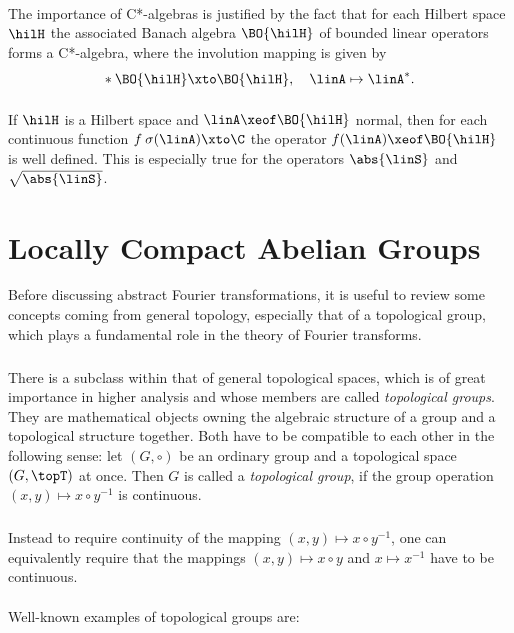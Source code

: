\documentclass[11pt,twoside]{article}
\begin{document}
\paragraph{} %
The importance of C*-algebras is justified by the fact 
that for each Hilbert space $\hilH$
the associated Banach algebra $\BO{\hilH}$ of bounded linear operators 
forms a C*-algebra, where the involution mapping is given by
\[
* \: \BO{\hilH} \xto \BO{\hilH}, \quad \linA \mapsto \linA^*.
\]

\paragraph{}
If $\hilH$ is a Hilbert space and $\linA \xeof \BO{\hilH}$ normal,
then for each continuous function $f \: \sigma(\linA) \xto \C$
the operator $f(\linA) \xeof \BO{\hilH}$ is well defined.
This is especially true for the operators 
$\abs{\linS} $ and $\sqrt{\abs{\linS} }$.

\section{Locally Compact Abelian Groups}
Before discussing abstract Fourier transformations,
it is useful to review some concepts coming from general topology,
especially that of a topological group, 
which plays a fundamental role in the theory of Fourier transforms.

\subparagraph{} %
There is a subclass within that of general topological spaces,
which is of great importance in higher analysis
and whose members are called \textit{topological groups}.
They are mathematical objects owning the algebraic structure of a group
and a topological structure together.
Both have to be compatible to each other in the following sense:
let $(G,\circ)$ be an ordinary group and a topological space $(G,\topT)$
at once.
Then $G$ is called a \textit{topological group},
if the group operation $(x,y) \mapsto x \circ y^{-1}$ is continuous.

\subparagraph{}
Instead to require continuity of the mapping $(x,y) \mapsto x \circ y^{-1}$,
one can equivalently require
that the mappings $(x,y) \mapsto x \circ y$ and $x \mapsto x^{-1}$
have to be continuous.

\paragraph{} %
Well-known examples of topological groups are:
\end{document}
